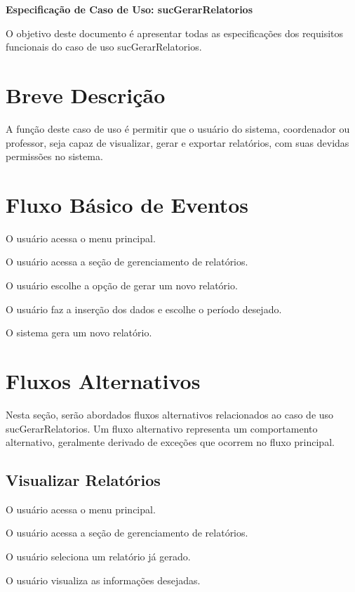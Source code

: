 \documentclass[12pt,a4paper]{article}
\newcommand{\ucnome}{sucGerarRelatorios}
\newcommand{\uctitulo}{Especificação de Caso de Uso: \ucnome}
\begin{document}

\begin{center}
  {\Large\bfseries \uctitulo}
\end{center}

\vspace{0.5\baselineskip}

O objetivo deste documento é apresentar todas as especificações dos requisitos
funcionais do caso de uso \ucnome.

\section{Breve Descrição}

A função deste caso de uso é permitir que o usuário do sistema, coordenador ou
professor, seja capaz de visualizar, gerar e exportar relatórios, com suas
devidas permissões no sistema.

\section{Fluxo Básico de Eventos}

\begin{fluxo}
  \item O usuário acessa o menu principal.
  \item O usuário acessa a seção de gerenciamento de relatórios.
  \item O usuário escolhe a opção de gerar um novo relatório.
  \item O usuário faz a inserção dos dados e escolhe o período desejado.
  \item O sistema gera um novo relatório.
\end{fluxo}

\section{Fluxos Alternativos}

Nesta seção, serão abordados fluxos alternativos relacionados ao caso de uso
\ucnome. Um fluxo alternativo representa um comportamento alternativo,
geralmente derivado de exceções que ocorrem no fluxo principal.

\subsection{Visualizar Relatórios}

\begin{fluxo}
  \item O usuário acessa o menu principal.
  \item O usuário acessa a seção de gerenciamento de relatórios.
  \item O usuário seleciona um relatório já gerado.
  \item O usuário visualiza as informações desejadas.
\end{fluxo}
\end{document}
